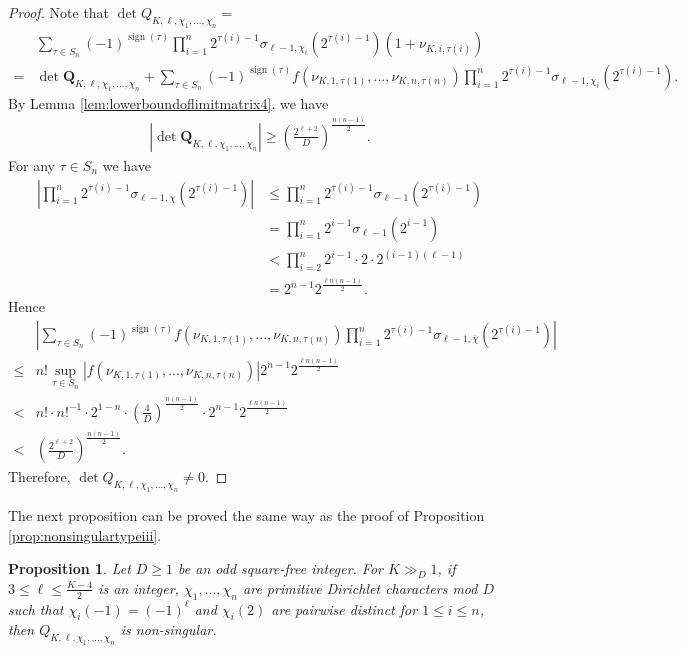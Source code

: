 \documentclass[11pt,letterpaper,reqno]{amsart}
\numberwithin{figure}{section}
\numberwithin{table}{section}
\theoremstyle{definition}
\theoremstyle{plain}
\newtheorem{proposition}[theorem]{Proposition}
\theoremstyle{definition}
\theoremstyle{definition}
\theoremstyle{remark}
\numberwithin{equation}{section}
\theoremstyle{remark}
\DeclareMathOperator{\sign}{sign}
\begin{document}
\begin{proof}
Note that $\det Q_{K,\ell,\chi_1,...,\chi_n}=$
    \begin{align*}
        &\sum_{\tau\in S_n}(-1)^{\sign(\tau)}\prod_{i=1}^n2^{\tau(i)-1}\sigma_{\ell-1,\chi_i}(2^{\tau(i)-1})(1+\nu_{K,i,\tau(i)})\\=&\det \mathbf{Q}_{K,\ell,\chi_1,...,\chi_n}+\sum_{\tau\in S_n}(-1)^{\sign(\tau)}f(\nu_{K,1,\tau(1)},...,\nu_{K,n,\tau(n)})\prod_{i=1}^n2^{\tau(i)-1}\sigma_{\ell-1,\chi_i}(2^{\tau(i)-1}).
    \end{align*}
By  Lemma \ref{lem:lowerboundoflimitmatrix4},  we have  
\begin{align*}
\left|\det \mathbf{Q}_{K,\ell,\chi_1,...,\chi_n}\right|\geq\left(\frac{2^{\ell+2}}{D}\right)^{\frac{n(n-1)}{2}}.
   \end{align*}
For any $\tau\in S_n$ we have 
\begin{align*}   \left|\prod_{i=1}^n2^{\tau(i)-1}\sigma_{\ell-1,\chi}(2^{\tau(i)-1}) \right|&\leq\prod_{i=1}^n2^{\tau(i)-1}\sigma_{\ell-1}(2^{\tau(i)-1})\\&=\prod_{i=1}^n2^{i-1}\sigma_{\ell-1}(2^{i-1})\\& < \prod_{i=2}^n2^{i-1}\cdot 2\cdot2^{(i-1)(\ell-1)}\\&=2^{n-1}2^{\frac{\ell n(n-1)}{2}}.
\end{align*}
Hence
   \begin{align*}
       &\left|\sum_{\tau\in S_n}(-1)^{\sign(\tau)}f(\nu_{K,1,\tau(1)},...,\nu_{K,n,\tau(n)})\prod_{i=1}^n2^{\tau(i)-1}\sigma_{\ell-1,\overline{\chi}}(2^{\tau(i)-1})\right|\\\leq & n! \sup_{\tau\in S_n}|f(\nu_{K,1,\tau(1)},...,\nu_{K,n,\tau(n)})|2^{n-1}2^{\frac{\ell n(n-1)}{2}}\\ <&n!\cdot n!^{-1}\cdot2^{1-n}\cdot\left(\frac{4}{D}\right)^{\frac{n(n-1)}{2}}\cdot 2^{n-1}2^{\frac{\ell n(n-1)}{2}}\\<&\left(\frac{2^{\ell+2}}{D}\right)^{\frac{n(n-1)}{2}}.
   \end{align*}
   Therefore,  $\det Q_{K,\ell,\chi_1,...,\chi_n}\neq 0$.
\end{proof}
The next proposition can be proved the same way as the proof of Proposition \ref{prop:nonsingulartypeiii}. 
\begin{proposition}\label{prop:twisttypeiv}
    Let $D\geq1$ be an odd square-free integer. For $K\gg_D1$, if $3\leq\ell\leq\frac{K-4}{2}$ is an integer, $\chi_1,...,\chi_n$ are primitive Dirichlet characters mod $D$ such that $\chi_i(-1)=(-1)^{\ell}$ and $\chi_i(2)$ are pairwise distinct for $1\leq i\leq n$, then $Q_{K,\ell,\chi_1,...,\chi_n}$ is non-singular.
\end{proposition}
\end{document}
